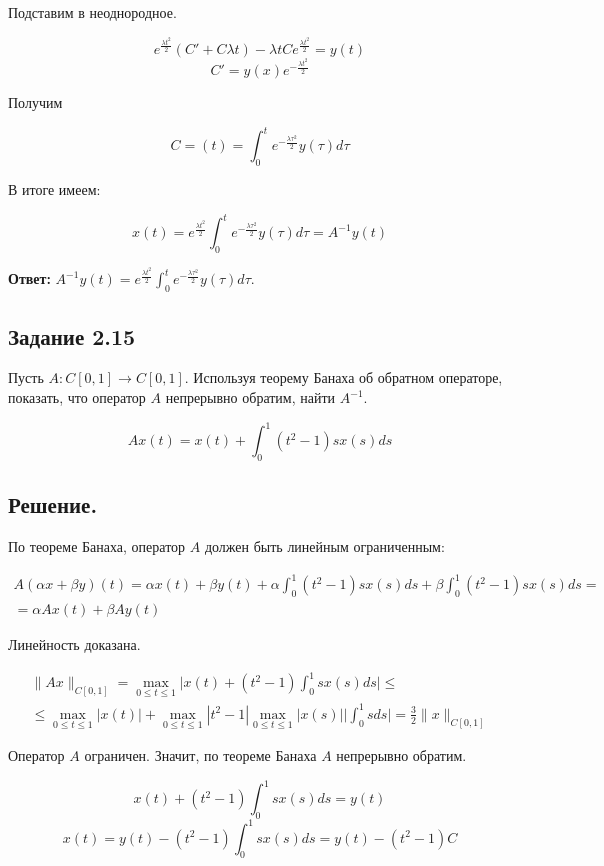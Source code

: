 \documentclass[a4paper, 12pt]{report}
\begin{document}
Подставим в неоднородное.

\[e^{ \frac{\lambda t^2}{2}} (C' + C \lambda t) - \lambda t C e^{ \frac{\lambda t^2}{2}} = y(t)\]
\[C' = y(x)e^{ - \frac{\lambda t^2}{2}}\]

Получим

\[C = (t) = \int_{0}^{t} e^{ - \frac{\lambda \tau^2}{2}} y(\tau) d \tau\]

В итоге имеем:

\[x(t) = e^{\frac{\lambda t^2}{2}} \int_{0}^{t} e^{ - \frac{\lambda \tau^2}{2}} y(\tau) d\tau =
A^{ - 1} y(t)\]

\textbf{Ответ: } $A^{ - 1} y(t) = e^{\frac{\lambda t^2}{2}} \int_{0}^{t} e^{ - \frac{\lambda \tau^2}{2}} y(\tau) d\tau$.

\subsection*{Задание 2.15}
Пусть $A: C[0, 1] \to C[0, 1]$. Используя теорему Банаха об обратном операторе,
показать, что оператор $A$ непрерывно обратим, найти $A^{-1}$.

\[Ax(t) = x(t) + \int_{0}^{1} (t^2 - 1) sx(s) ds\]

\subsection*{Решение.}

По теореме Банаха, оператор $A$ должен быть линейным ограниченным:

\begin{multline*}
A(\alpha x + \beta y)(t) = \alpha x(t) + \beta y(t) + 
\alpha \int_{0}^{1} (t^2 - 1) s x(s) ds + 
\beta \int_{0}^{1} (t^2 - 1) sx(s) ds = \\ =
\alpha A x(t) + \beta A y(t)
\end{multline*}

Линейность доказана.

\begin{multline*}
\| A x\|_{C[0, 1]} = \max_{0 \le t \le 1}
\Big| x(t) + (t^2 - 1)\int_{0}^{1} sx(s) ds \Big| \le \\ \le
\max_{0 \le t \le 1} | x(t) | + \max_{0 \le t \le 1}
| t^2 - 1| \max_{0 \le t \le 1}
| x(s) | \Big| \int_{0}^{1} s ds \Big| =
\frac{3}{2} \| x \|_{C[0, 1]}
\end{multline*}

Оператор $A$ ограничен. Значит, по теореме Банаха $A$ непрерывно обратим.

\[x(t) + (t^2 - 1) \int_{0}^{1} s x(s) ds = y(t)\]
\[x(t) = y(t) - (t^2 - 1)\int_{0}^{1} s x(s) ds = 
y(t) - (t^2 - 1) C\]
\end{document}
